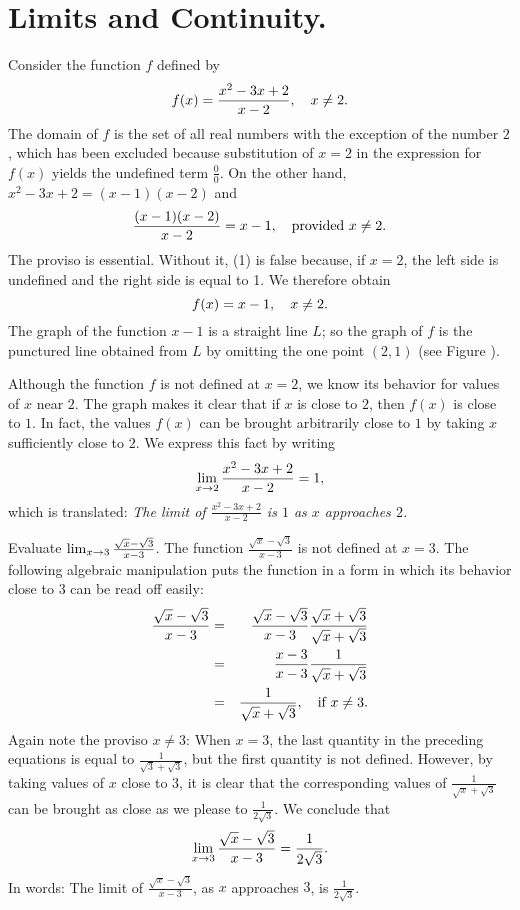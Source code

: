 \section{Limits and Continuity.}\label{sec 1.4}
Consider the function $f$ defined by
\[
f(x) = \frac{x^{2} - 3x + 2}{x - 2},
\quad x \neq 2.
\]
The domain of $f$ is the set of all real numbers
with the exception of the number $2$,
which has been excluded because substitution of $x = 2$
in the expression for $f(x)$
yields the undefined term $\frac{0}{0}$.
On the other hand,
$x^{2} - 3x + 2 = (x - 1)(x - 2)$
and
\begin{equation}
\frac{(x - 1)(x - 2)}{x - 2} = x - 1,
\quad \mbox{provided  $x \neq 2$}. 
\label{eq1.4.1}
\end{equation}
The proviso is essential.
Without it, (1) is false because,
if $x = 2$,
the left side is undefined
and the right side is equal to 1.
We therefore obtain
\[
f(x) = x - 1,
\quad x \neq 2.
\]
The graph of the function $x - 1$ is a straight line $L$;
so the graph of $f$ is the punctured line
obtained from $L$
by omitting the one point $(2,1)$
(see Figure ). 

Although the function $f$ is not defined at $x = 2$,
we know its behavior for values of $x$ near $2$.
The graph makes it clear that if $x$ is close to $2$,
then $f(x)$ is close to $1$.
In fact, the values $f(x)$ can be brought arbitrarily close to $1$
by taking $x$ sufficiently close to $2$.
We express this fact by writing 
\[
\lim_{x \rightarrow 2} {\frac{x^2 - 3x + 2}{x -2}} = 1,
\]
which is translated:
\emph{The limit of $\frac{x^2 - 3x +2}{x - 2}$
is $1$ as $x$ approaches $2$.}

\begin{example}\label{exam 1.4.1}
Evaluate
$\lim_{x \rightarrow 3} {\frac{\sqrt{x} - \sqrt{3}}{x - 3}}$.
The function
$\frac{\sqrt{x} - \sqrt{3}}{x - 3}$
is not defined at $x = 3$.
The following algebraic manipulation
puts the function in a form
in which its behavior close to $3$ can be read off easily:
\begin{eqnarray*}
\frac{\sqrt{x} - \sqrt{3}}{x - 3} 
&=& \frac{\sqrt{x} - \sqrt{3}}{x - 3}
   \frac{\sqrt{x} + \sqrt{3}}{\sqrt{x} + \sqrt{3}} \\
&=& \frac{x - 3}{x - 3} \frac{1}{\sqrt{x} + \sqrt{3}} \\
&=& \frac{1}{\sqrt{x} + \sqrt{3}},  \quad \mbox{if  $x \neq 3$}. 
\end{eqnarray*}
Again note the proviso $x \neq 3$:
When $x = 3$,
the last quantity in the preceding equations
is equal to $\frac{1}{\sqrt{3} + \sqrt{3}}$,
but the first quantity is not defined.
However, by taking values of $x$ close to 3,
it is clear that the corresponding values of
$\frac{1}{\sqrt{x} + \sqrt{3}}$
can be brought as close as we please to
$\frac{1}{2 \sqrt{3}}$.
We conclude that  
\[
\lim_{x \rightarrow 3}
{\frac {\sqrt{x} - \sqrt{3}}{x - 3}}
=
\frac{1}{2{\sqrt{3}}}.
\]
In words:
The limit of
$\frac {\sqrt{x} - \sqrt{3}}{x - 3}$,
as $x$ approaches $3$,
is $\frac{1}{2{\sqrt{3}}}$.
\end{example} 

